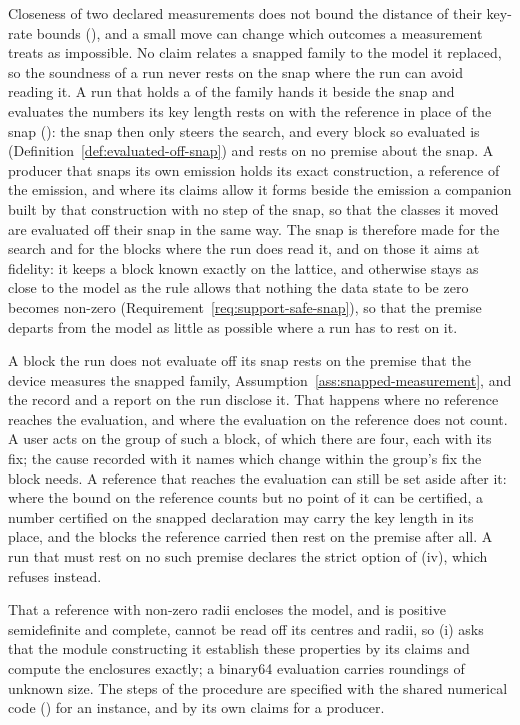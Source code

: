 Closeness of two declared measurements does not bound the distance of their
key-rate bounds (), and a small move can
change which outcomes a measurement treats as impossible. No claim relates a
snapped family to the model it replaced, so the soundness of a run never
rests on the snap where the run can avoid reading it. A run that holds a
 of the family hands it beside the snap and evaluates the
numbers its key length rests on with the reference in place of the snap
(): the snap then only
steers the search, and every block so evaluated is  (Definition~\ref{def:evaluated-off-snap}) and rests on no premise about
the snap. A producer that snaps its own emission holds its exact construction,
a reference of the emission, and where its claims allow it forms beside the
emission a companion built by that construction with no step of the snap,
so that the classes it moved are evaluated off their snap in the same way. The snap is therefore made for the search and for the blocks where
the run does read it, and on those it aims at fidelity: it keeps a block known
exactly on the lattice, and otherwise stays as close to the model as the rule
allows that nothing the data state to be zero becomes non-zero
(Requirement~\ref{req:support-safe-snap}), so that the premise departs from
the model as little as possible where a run has to rest on it.

A block the run does not evaluate off its snap rests on the premise that the
device measures the snapped family, Assumption~\ref{ass:snapped-measurement},
and the record and a report on the run disclose it. That happens where no
reference reaches the evaluation, and where the evaluation on the reference
does not count. A user acts on the group of such a block, of which there are
four, each with its fix; the cause recorded with it names which change within
the group's fix the block needs. A reference that reaches the evaluation can
still be set aside after it: where the bound on the reference counts but no
point of it can be certified, a number certified on the snapped declaration
may carry the key length in its place, and the blocks the reference carried
then rest on the premise after all. A run that must rest on no such premise
declares the strict option of (iv), which refuses instead.

That a reference with non-zero radii encloses the model, and is positive
semidefinite and complete, cannot be read off its centres and radii, so (i)
asks that the module constructing it establish these properties by its claims
and compute the enclosures exactly; a binary64 evaluation carries roundings of
unknown size. The steps of the procedure are specified with the shared
numerical code () for an instance, and by its
own claims for a producer.

